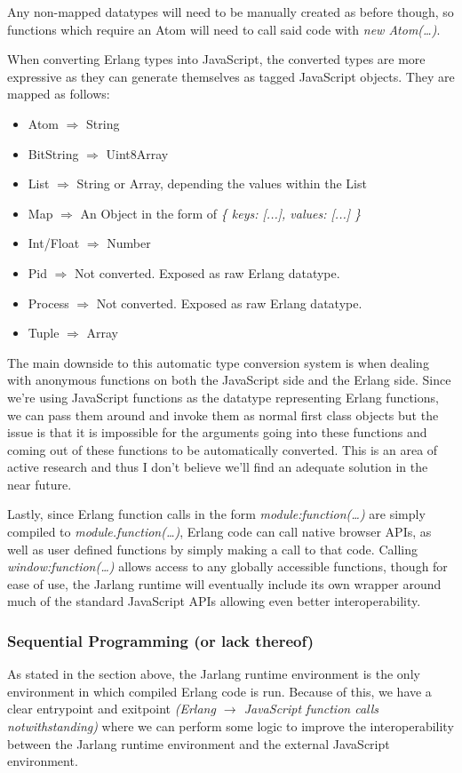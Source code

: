 \documentclass[twoside,12pt,titlepage,a4paper]{article}
\begin{document}
Any non-mapped datatypes will need to be manually created as before though, so functions which require an Atom will need to call said code with \textit{new Atom(\dots)}.

When converting Erlang types into JavaScript, the converted types are more expressive as they can generate themselves as tagged JavaScript objects. They are mapped as follows:

\begin{itemize}
	\item Atom $\Rightarrow$ String
	\item BitString $\Rightarrow$ Uint8Array
	\item List $\Rightarrow$ String or Array, depending the values within the List
	\item Map $\Rightarrow$ An Object in the form of \textit{\{ keys: [...], values: [...] \}}
	\item Int/Float $\Rightarrow$ Number
	\item Pid $\Rightarrow$ Not converted. Exposed as raw Erlang datatype.
	\item Process $\Rightarrow$ Not converted. Exposed as raw Erlang datatype.
	\item Tuple $\Rightarrow$ Array
\end{itemize}

The main downside to this automatic type conversion system is when dealing with anonymous functions on both the JavaScript side and the Erlang side. Since we're using JavaScript functions as the datatype representing Erlang functions, we can pass them around and invoke them as normal first class objects but the issue is that it is impossible for the arguments going into these functions and coming out of these functions to be automatically converted. This is an area of active research and thus I don't believe we'll find an adequate solution in the near future.

Lastly, since Erlang function calls in the form \textit{module:function(\dots)} are simply compiled to \textit{module.function(\dots)}, Erlang code can call native browser APIs, as well as user defined functions by simply making a call to that code. Calling \textit{window:function(\dots)} allows access to any globally accessible functions, though for ease of use, the Jarlang runtime will eventually include its own wrapper around much of the standard JavaScript APIs allowing even better interoperability.

\subsubsection{Sequential Programming (or lack thereof)}
As stated in the section above, the Jarlang runtime environment is the only environment in which compiled Erlang code is run. Because of this, we have a clear entrypoint and exitpoint \textit{(Erlang $\rightarrow$ JavaScript function calls notwithstanding)} where we can perform some logic to improve the interoperability between the Jarlang runtime environment and the external JavaScript environment.
\end{document}
